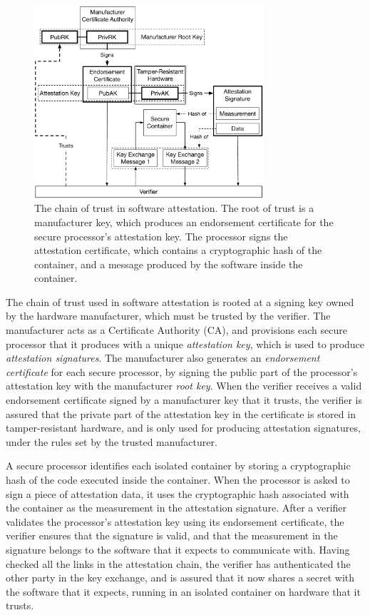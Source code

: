 \begin{figure}[hbt]
  \centering
  \includegraphics[width=85mm]{figures/generic_attestation_chain.pdf}
  \caption{
    The chain of trust in software attestation. The root of trust is a
    manufacturer key, which produces an endorsement certificate for the secure
    processor's attestation key. The processor signs the attestation
    certificate, which contains a cryptographic hash of the container, and a
    message produced by the software inside the container.
  }
  \label{fig:generic_attestation_chain}
\end{figure}

The chain of trust used in software attestation is rooted at a signing key
owned by the hardware manufacturer, which must be trusted by the verifier. The
manufacturer acts as a Certificate Authority (CA), and provisions each secure
processor that it produces with a unique \textit{attestation key}, which is
used to produce \textit{attestation signatures}. The manufacturer also
generates an \textit{endorsement certificate} for each secure processor,
by signing the public part of the processor's attestation key with the
manufacturer \textit{root key}. When the verifier receives a valid endorsement
certificate signed by a manufacturer key that it trusts, the verifier is
assured that the private part of the attestation key in the certificate is
stored in tamper-resistant hardware, and is only used for producing attestation
signatures, under the rules set by the trusted manufacturer.

A secure processor identifies each isolated container by storing a
cryptographic hash of the code executed inside the container. When the
processor is asked to sign a piece of attestation data, it uses the
cryptographic hash associated with the container as the measurement in the
attestation signature. After a verifier validates the processor's attestation
key using its endorsement certificate, the verifier ensures that the signature
is valid, and that the measurement in the signature belongs to the software
that it expects to communicate with. Having checked all the links in the
attestation chain, the verifier has authenticated the other party in the key
exchange, and is assured that it now shares a secret with the software that it
expects, running in an isolated container on hardware that it trusts.
